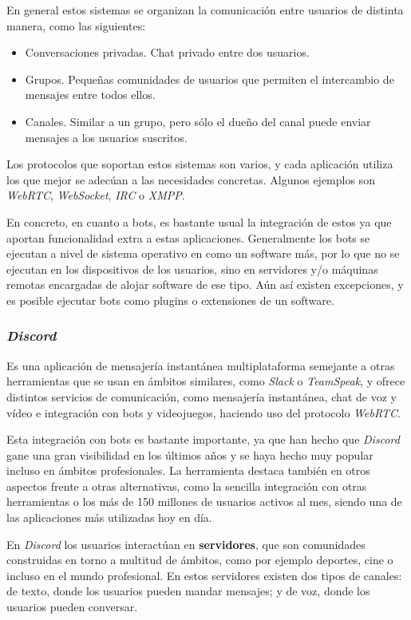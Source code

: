 En general estos sistemas se organizan la comunicación entre usuarios de distinta manera, como las siguientes:

\begin{itemize}
	\item Conversaciones privadas. Chat privado entre dos usuarios.
	\item Grupos. Pequeñas comunidades de usuarios que permiten el intercambio de mensajes entre todos ellos.
	\item Canales. Similar a un grupo, pero sólo el dueño del canal puede enviar mensajes a los usuarios suscritos.
\end{itemize}

Los protocolos que soportan estos sistemas son varios, y cada aplicación utiliza los que mejor se adecúan a las necesidades concretas. Algunos ejemplos son \textit{WebRTC}, \textit{WebSocket}, \textit{IRC} o \textit{XMPP}.

En concreto, en cuanto a bots, es bastante usual la integración de estos ya que aportan funcionalidad extra a estas aplicaciones. Generalmente los bots se ejecutan a nivel de sistema operativo en  como un software más, por lo que no se ejecutan en los dispositivos de los usuarios, sino en servidores y/o máquinas remotas encargadas de alojar software de ese tipo. Aún así existen excepciones, y es posible ejecutar bots como plugins o extensiones de un software.


\subsubsection{\textit{Discord}}

Es una aplicación de mensajería instantánea multiplataforma semejante a otras herramientas que se usan en ámbitos similares, como \textit{Slack} o \textit{TeamSpeak}, y ofrece distintos servicios de comunicación, como mensajería instantánea, chat de voz y vídeo e integración con bots y videojuegos, haciendo uso del protocolo \textit{WebRTC}.

Esta integración con bots es bastante importante, ya que han hecho que \textit{Discord} gane una gran visibilidad en los últimos años y se haya hecho muy popular incluso en ámbitos profesionales. La herramienta destaca también en otros aspectos\cite{earthweb} frente a otras alternativas, como la sencilla integración con otras herramientas o los más de 150 millones de usuarios activos al mes, siendo una de las aplicaciones más utilizadas hoy en día.

En \textit{Discord} los usuarios interactúan en \textbf{servidores}, que son comunidades construidas en torno a multitud de ámbitos, como por ejemplo deportes, cine o incluso en el mundo profesional. En estos servidores existen dos tipos de canales: de texto, donde los usuarios pueden mandar mensajes; y de voz, donde los usuarios pueden conversar.

